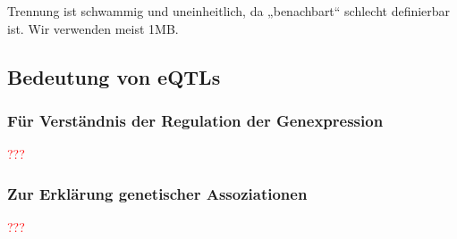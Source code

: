 Trennung ist schwammig und uneinheitlich, da „benachbart“ schlecht definierbar ist. Wir verwenden meist 1MB.

\subsection{Bedeutung von eQTLs}

\subsubsection{Für Verständnis der Regulation der Genexpression}
\textcolor{red}{???}
\subsubsection{Zur Erklärung genetischer Assoziationen}
\textcolor{red}{???}
